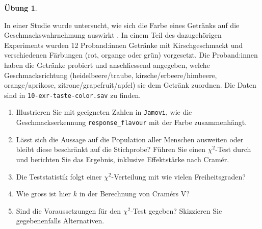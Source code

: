 \documentclass[
]{book}
\providecommand{\tightlist}{%
  \setlength{\itemsep}{0pt}\setlength{\parskip}{0pt}}
\theoremstyle{definition}
\theoremstyle{definition}
\theoremstyle{definition}
\newtheorem{exercise}{Übung}[chapter]
\theoremstyle{definition}
\theoremstyle{remark}
\begin{document}
\begin{exercise}
\protect\hypertarget{exr:taste-color}{}\label{exr:taste-color}\leavevmode

In einer Studie wurde untersucht, wie sich die Farbe eines Getränks auf die Geschmackswahrnehmung auswirkt \citep{dubose1980}. In einem Teil des dazugehörigen Experiments wurden 12 Proband:innen Getränke mit Kirschgeschmackt und verschiedenen Färbungen (rot, organge oder grün) vorgesetzt. Die Proband:innen haben die Getränke probiert und anschliessend angegeben, welche Geschmacksrichtung (heidelbeere/traube, kirsche/erbeere/himbeere, orange/aprikose, zitrone/grapefruit/apfel) sie dem Getränk zuordnen. Die Daten sind in \texttt{10-exr-taste-color.sav} zu finden.

\begin{enumerate}
\def\labelenumi{\alph{enumi})}
\tightlist
\item
  Illustrieren Sie mit geeigneten Zahlen in \texttt{Jamovi}, wie die Geschmackserkennung \texttt{response\_flavour} mit der Farbe zusammenhängt.
\item
  Lässt sich die Aussage auf die Population aller Menschen ausweiten oder bleibt diese beschränkt auf die Stichprobe? Führen Sie einen \(\chi^2\)-Test durch und berichten Sie das Ergebnis, inklusive Effektstärke nach Cramér.
\item
  Die Teststatistik folgt einer \(\chi^2\)-Verteilung mit wie vielen Freiheitsgraden?
\item
  Wie gross ist hier \(k\) in der Berechnung von Cramérs V?
\item
  Sind die Voraussetzungen für den \(\chi^2\)-Test gegeben? Skizzieren Sie gegebenenfalls Alternativen.
\end{enumerate}

\end{exercise}
\end{document}
